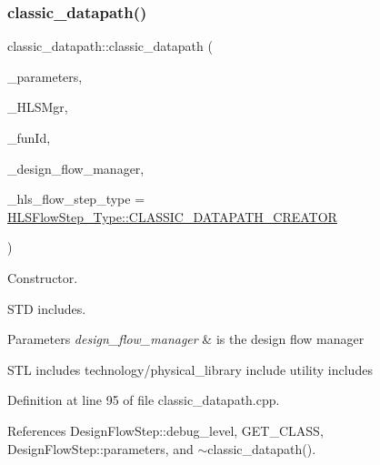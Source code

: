 \subsubsection{\texorpdfstring{classic\+\_\+datapath()}{classic\_datapath()}}
{\footnotesize\ttfamily classic\+\_\+datapath\+::classic\+\_\+datapath (\begin{DoxyParamCaption}\item[{const \hyperlink{Parameter_8hpp_a37841774a6fcb479b597fdf8955eb4ea}{Parameter\+Const\+Ref}}]{\+\_\+parameters,  }\item[{const \hyperlink{hls__manager_8hpp_acd3842b8589fe52c08fc0b2fcc813bfe}{H\+L\+S\+\_\+manager\+Ref}}]{\+\_\+\+H\+L\+S\+Mgr,  }\item[{unsigned int}]{\+\_\+fun\+Id,  }\item[{const Design\+Flow\+Manager\+Const\+Ref}]{\+\_\+design\+\_\+flow\+\_\+manager,  }\item[{const \hyperlink{hls__step_8hpp_ada16bc22905016180e26fc7e39537f8d}{H\+L\+S\+Flow\+Step\+\_\+\+Type}}]{\+\_\+hls\+\_\+flow\+\_\+step\+\_\+type = {\ttfamily \hyperlink{hls__step_8hpp_ada16bc22905016180e26fc7e39537f8dab8c079f2d09577111672eaff242d7a56}{H\+L\+S\+Flow\+Step\+\_\+\+Type\+::\+C\+L\+A\+S\+S\+I\+C\+\_\+\+D\+A\+T\+A\+P\+A\+T\+H\+\_\+\+C\+R\+E\+A\+T\+OR}} }\end{DoxyParamCaption})}



Constructor. 

S\+TD includes.


\begin{DoxyParams}{Parameters}
{\em design\+\_\+flow\+\_\+manager} & is the design flow manager\\
\hline
\end{DoxyParams}
S\+TL includes technology/physical\+\_\+library include utility includes 

Definition at line 95 of file classic\+\_\+datapath.\+cpp.



References Design\+Flow\+Step\+::debug\+\_\+level, G\+E\+T\+\_\+\+C\+L\+A\+SS, Design\+Flow\+Step\+::parameters, and $\sim$classic\+\_\+datapath().

